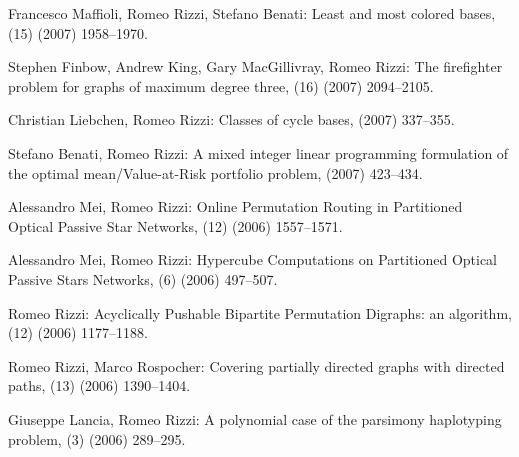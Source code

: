 \begin{etaremune}
  \item {\sc Francesco Maffioli, Romeo Rizzi, Stefano Benati:}
   \newblock  Least and most colored bases,
   (15) (2007) 1958--1970.

  \item {\sc Stephen Finbow, Andrew King, Gary MacGillivray, Romeo Rizzi:}
   \newblock  The firefighter problem for graphs of maximum degree three,
   (16) (2007) 2094--2105.

  \item {\sc Christian Liebchen, Romeo Rizzi:}
   \newblock  Classes of cycle bases,
    (2007) 337--355.

  \item {\sc Stefano Benati, Romeo Rizzi:}
   \newblock  A mixed integer linear programming formulation
              of the optimal mean/Value-at-Risk portfolio problem,
    (2007) 423--434.

  \item {\sc Alessandro Mei, Romeo Rizzi:}
   \newblock  Online Permutation Routing in
              Partitioned Optical Passive Star Networks,
   (12) (2006) 1557--1571.

  \item {\sc Alessandro Mei, Romeo Rizzi:}
   \newblock  Hypercube Computations on Partitioned Optical
              Passive Stars Networks,
   (6) (2006) 497--507.

  \item {\sc Romeo Rizzi:}
   \newblock  Acyclically Pushable Bipartite Permutation Digraphs: an algorithm,
   (12) (2006) 1177--1188.

  \item {\sc Romeo Rizzi, Marco Rospocher:}
   \newblock  Covering partially directed graphs with directed paths,
   (13) (2006) 1390--1404.

  \item {\sc Giuseppe Lancia, Romeo Rizzi:}
   \newblock  A polynomial case of the parsimony haplotyping problem,
   (3) (2006) 289--295.


\end{etaremune}
